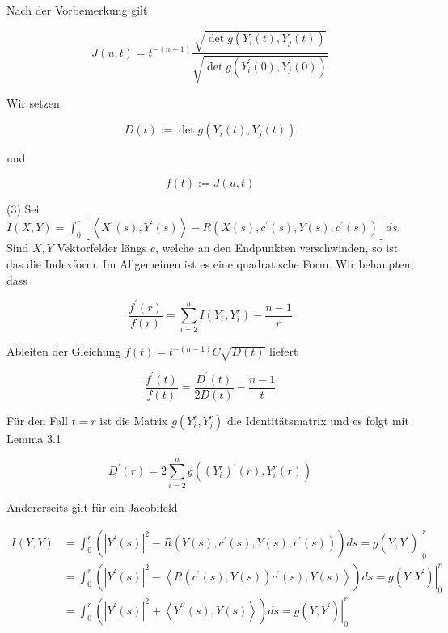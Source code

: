 \documentclass[10pt]{article}
\begin{document}
Nach der Vorbemerkung gilt

$$
J(u, t)=t^{-(n-1)} \frac{\sqrt{\operatorname{det} g\left(Y_{i}(t), Y_{j}(t)\right)}}{\sqrt{\operatorname{det} g\left(Y_{i}^{\prime}(0), Y_{j}^{\prime}(0)\right)}}
$$

Wir setzen

$$
D(t):=\operatorname{det} g\left(Y_{i}(t), Y_{j}(t)\right)
$$

und

$$
f(t):=J(u, t)
$$

(3) Sei\\
$I(X, Y)=\int_{0}^{r}\left[\left\langle X^{\prime}(s), Y^{\prime}(s)\right\rangle-R\left(X(s), c^{\prime}(s), Y(s), c^{\prime}(s)\right)\right] d s$.\\
Sind $X, Y$ Vektorfelder längs $c$, welche an den Endpunkten verschwinden, so ist das die Indexform. Im Allgemeinen ist es eine quadratische Form. Wir behaupten, dass


\begin{equation*}
\frac{f^{\prime}(r)}{f(r)}=\sum_{i=2}^{n} I\left(Y_{i}^{r}, Y_{i}^{r}\right)-\frac{n-1}{r} \tag{12}
\end{equation*}


Ableiten der Gleichung $f(t)=t^{-(n-1)} C \sqrt{D(t)}$ liefert

$$
\frac{f^{\prime}(t)}{f(t)}=\frac{D^{\prime}(t)}{2 D(t)}-\frac{n-1}{t}
$$

Für den Fall $t=r$ ist die Matrix $g\left(Y_{i}^{r}, Y_{j}^{r}\right)$ die Identitätsmatrix und es folgt mit Lemma 3.1

$$
D^{\prime}(r)=2 \sum_{i=2}^{n} g\left(\left(Y_{i}^{r}\right)^{\prime}(r), Y_{i}^{r}(r)\right)
$$

Andererseits gilt für ein Jacobifeld

$$
\begin{aligned}
I(Y, Y) & =\int_{0}^{r}\left(\left|Y^{\prime}(s)\right|^{2}-R\left(Y(s), c^{\prime}(s), Y(s), c^{\prime}(s)\right)\right) d s=\left.g\left(Y, Y^{\prime}\right)\right|_{0} ^{r} \\
& =\int_{0}^{r}\left(\left|Y^{\prime}(s)\right|^{2}-\left\langle R\left(c^{\prime}(s), Y(s)\right) c^{\prime}(s), Y(s)\right\rangle\right) d s=\left.g\left(Y, Y^{\prime}\right)\right|_{0} ^{r} \\
& =\int_{0}^{r}\left(\left|Y^{\prime}(s)\right|^{2}+\left\langle Y^{\prime \prime}(s), Y(s)\right\rangle\right) d s=\left.g\left(Y, Y^{\prime}\right)\right|_{0} ^{r}
\end{aligned}
$$
\end{document}
